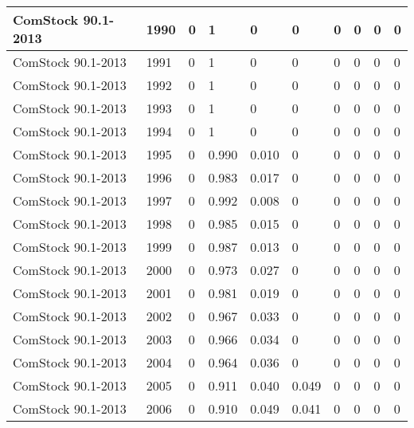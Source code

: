 \begin{table}
\begin{tabular}{|l|l|l|l|l|l|l|l|l|l|}
ComStock 90.1-2013 & 1990      & 0 & 1     & 0     & 0         & 0        & 0        & 0        & 0        \\ \hline
ComStock 90.1-2013 & 1991      & 0 & 1     & 0     & 0         & 0        & 0        & 0        & 0        \\ \hline
ComStock 90.1-2013 & 1992      & 0 & 1     & 0     & 0         & 0        & 0        & 0        & 0        \\ \hline
ComStock 90.1-2013 & 1993      & 0 & 1     & 0     & 0         & 0        & 0        & 0        & 0        \\ \hline
ComStock 90.1-2013 & 1994      & 0 & 1     & 0     & 0         & 0        & 0        & 0        & 0        \\ \hline
ComStock 90.1-2013 & 1995      & 0 & 0.990 & 0.010 & 0         & 0        & 0        & 0        & 0        \\ \hline
ComStock 90.1-2013 & 1996      & 0 & 0.983 & 0.017 & 0         & 0        & 0        & 0        & 0        \\ \hline
ComStock 90.1-2013 & 1997      & 0 & 0.992 & 0.008 & 0         & 0        & 0        & 0        & 0        \\ \hline
ComStock 90.1-2013 & 1998      & 0 & 0.985 & 0.015 & 0         & 0        & 0        & 0        & 0        \\ \hline
ComStock 90.1-2013 & 1999      & 0 & 0.987 & 0.013 & 0         & 0        & 0        & 0        & 0        \\ \hline
ComStock 90.1-2013 & 2000      & 0 & 0.973 & 0.027 & 0         & 0        & 0        & 0        & 0        \\ \hline
ComStock 90.1-2013 & 2001      & 0 & 0.981 & 0.019 & 0         & 0        & 0        & 0        & 0        \\ \hline
ComStock 90.1-2013 & 2002      & 0 & 0.967 & 0.033 & 0         & 0        & 0        & 0        & 0        \\ \hline
ComStock 90.1-2013 & 2003      & 0 & 0.966 & 0.034 & 0         & 0        & 0        & 0        & 0        \\ \hline
ComStock 90.1-2013 & 2004      & 0 & 0.964 & 0.036 & 0         & 0        & 0        & 0        & 0        \\ \hline
ComStock 90.1-2013 & 2005      & 0 & 0.911 & 0.040 & 0.049     & 0        & 0        & 0        & 0        \\ \hline
ComStock 90.1-2013 & 2006      & 0 & 0.910 & 0.049 & 0.041     & 0        & 0        & 0        & 0        \\ \hline

\end{tabular}
\end{table}
